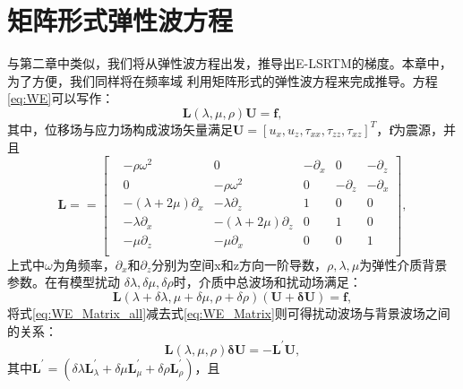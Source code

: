 \section{矩阵形式弹性波方程}
与第二章中类似，我们将从弹性波方程出发，推导出E-LSRTM的梯度。本章中，为了方便，我们同样将在频率域
利用矩阵形式的弹性波方程来完成推导。方程\ref{eq:WE}可以写作：
\begin{equation}
\mathbf{L}(\lambda,\mu,\rho)\mathbf{U}=\mathbf{f},
    \label{eq:WE_Matrix} 
\end{equation}
其中，位移场与应力场构成波场矢量满足$\mathbf{U}=[u_x,u_z,\tau_{xx},\tau_{zz},\tau_{xz}]^T$，$\mathbf{f}$为震源，并且
\begin{equation}
        \mathbf{L}=
        =
        \begin{bmatrix}
			&-\rho\omega^2 &0 &-\partial_x & 0 &-\partial_z\\
			& 0  &-\rho\omega^2 &0 &-\partial_z &-\partial_x\\
			&-(\lambda+2\mu)\partial_x &-\lambda\partial_z &1 &0&0\\
			& -\lambda\partial_x  &-(\lambda+2\mu)\partial_z &0 &1&0\\
			& -\mu\partial_z  &-\mu\partial_x &0 &0&1\\
        \end{bmatrix},
        \label{eq:L}
\end{equation}
上式中$\omega$为角频率，$\partial_x$和$\partial_z$分别为空间x和z方向一阶导数，$\rho,\lambda,\mu$为弹性介质背景参数。在有模型扰动
$\delta\lambda,\delta\mu,\delta\rho$时，介质中总波场和扰动场满足：
\begin{equation}
\mathbf{L}(\lambda+\delta\lambda,\mu+\delta\mu,\rho+\delta\rho)(\mathbf{U+\delta U})=\mathbf{f},
    \label{eq:WE_Matrix_all} 
\end{equation}
将式\ref{eq:WE_Matrix_all}减去式\ref{eq:WE_Matrix}则可得扰动波场与背景波场之间的关系：
\begin{equation}
\mathbf{L}(\lambda,\mu,\rho)\mathbf{\delta U}=-\mathbf{L}^{'}\mathbf{U},
    \label{eq:WE_Matrix_delta} 
\end{equation}
其中$\mathbf{L}^{'}=(\delta\lambda\mathbf{L}^{'}_{\lambda}+\delta\mu\mathbf{L}^{'}_{\mu}+\delta\rho\mathbf{L}^{'}_{\rho})$，且
